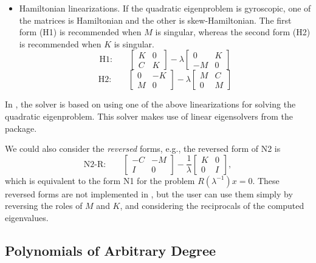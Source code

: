 \begin{itemize}
\medskip
\item Hamiltonian linearizations. If the quadratic eigenproblem is gyroscopic, one of the matrices is Hamiltonian and the other is skew-Hamiltonian. The first form (H1) is recommended when $M$ is singular, whereas the second form (H2) is recommended when $K$ is singular.
\begin{equation}
\label{eq:h1}
\mbox{H1:}\qquad
\left[\begin{array}{cc}K & 0\\C & K\end{array}\right]-\lambda\left[\begin{array}{cc} 0 & K\\-M & 0\end{array}\right]
\end{equation}
\begin{equation}
\label{eq:h2}
\mbox{H2:}\qquad
\left[\begin{array}{cc}0 & -K\\M & 0\end{array}\right]-\lambda\left[\begin{array}{cc}M & C\\ 0 & M\end{array}\right]
\end{equation}
\end{itemize}

In \slepc, the  solver is based on using one of the above linearizations for solving the quadratic eigenproblem. This solver makes use of linear eigensolvers from the  package.

We could also consider the \emph{reversed} forms, e.g., the reversed form of N2 is
\begin{equation}
\label{eq:n2r}
\mbox{N2-R:}\qquad
\left[\begin{array}{cc}-C & -M\\I & 0\end{array}\right]-\frac{1}{\lambda}\left[\begin{array}{cc}K & 0\\0 & I\end{array}\right],
\end{equation}
which is equivalent to the form N1 for the problem $R(\lambda^{-1})x=0$. These reversed forms are not implemented in \slepc, but the user can use them simply by reversing the roles of $M$ and $K$, and considering the reciprocals of the computed eigenvalues.

\subsection{\label{sec:pep1}Polynomials of Arbitrary Degree}

